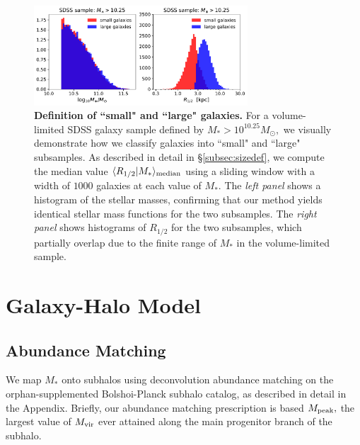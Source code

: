 \documentclass[usenatbib,usegraphicx,letterpaper]{mn2e}
\newcommand{\rhalf}{R_{1/2}}
\newcommand{\mstar}{M_{\ast}}
\newcommand{\mvir}{M_{\rm vir}}
\newcommand{\mpeak}{M_{\rm peak}}
\newcommand{\median}[2]{\langle{#1}\vert{#2}\rangle_{\rm median}}
\begin{document}
\begin{figure}
\centering
\includegraphics[width=8cm]{FIGS/sdss_small_large_sample_definitions.pdf}
\caption{
{\bf Definition of ``small" and ``large" galaxies.} For a volume-limited SDSS galaxy sample defined by $M_{\ast}>10^{10.25}M_{\odot},$ we visually demonstrate how we classify galaxies into ``small" and ``large" subsamples. As described in detail in \S\ref{subsec:sizedef}, we compute the median value $\median{\rhalf}{\mstar}$ using a sliding window with a width of $1000$ galaxies at each value of $\mstar.$ The {\em left panel} shows a histogram of the stellar masses, confirming that our method yields identical stellar mass functions for the two subsamples. The {\em right panel} shows histograms of $\rhalf$ for the two subsamples, which partially overlap due to the finite range of $\mstar$ in the volume-limited sample.
}
\label{fig:sizedefinition}
\end{figure}

\section{Galaxy-Halo Model}
\label{sec:model}

\subsection{Abundance Matching}
\label{subsec:sham}

We map $\mstar$ onto subhalos using deconvolution abundance matching on the orphan-supplemented Bolshoi-Planck subhalo catalog, as described in detail in the Appendix. Briefly, our abundance matching prescription is based $\mpeak,$ the largest value of $\mvir$ ever attained along the main progenitor branch of the subhalo.
\end{document}
